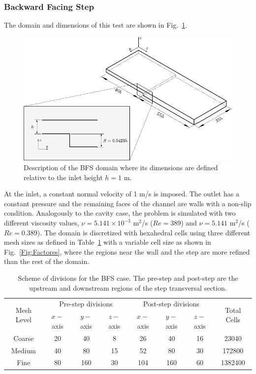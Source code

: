 \documentclass[final,3p,times,11pt,onecolumn]{myElsarticle}
\numberwithin{equation}{section}
\begin{document}
\subsubsection{Backward Facing Step}
The domain and dimensions of this test are shown in Fig.~\ref{Fig:Geometria3}.
\begin{figure}[t!!!]
\centering
\includegraphics[width=12cm]{fig/Cases/Geometria3.pdf}
\caption{Description of the BFS domain where its dimensions are defined relative to the inlet height $h = 1$ m.}
\label{Fig:Geometria3}
\end{figure}
At the inlet, a constant normal velocity of 1 m/s is imposed. The outlet has a constant pressure and the remaining faces of the channel are walls with a non-slip condition. Analogously to the cavity case, the problem is simulated with two different viscosity values, $\nu = 5.141 \times 10^{-3}$ m$^2$/s ($Re=389$) and $\nu = 5.141$ m$^2$/s ($Re=0.389$). The domain is discretized with hexahedral cells using three different mesh sizes as defined in Table~\ref{Table:BFSMeshes} with a variable cell size as shown in Fig.~\ref{Fig:Factores}, where the regions near the wall and the step are more refined than the rest of the domain.
\begin{table}[b!]
\centering
\begin{tabular}{cccccccc}
\hline 
\multirow{2}{1cm}{Mesh Level} & \multicolumn{3}{c}{Pre-step divisions} & \multicolumn{3}{c}{Post-step divisions} & \multirow{2}{1cm}{Total Cells} \\ 
\cline{2-7} 
&  $x-$axis &  $y-$axis &  $z-$axis &  $x-$axis &  $y-$axis &  $z-$axis \\ 
\hline 
Coarse & 20 & 40 & 8 & 26 & 40 & 16 & 23040 \\ 
Medium & 40 & 80 & 15 & 52 & 80 & 30 & 172800 \\ 
Fine & 80 & 160 & 30 & 104 & 160 & 60 & 1382400 \\ 
\hline 
\end{tabular}
\caption{Scheme of divisions for the BFS case. The pre-step and post-step are the upstream and downstream regions of the step transversal section.}
\label{Table:BFSMeshes}
\end{table}
\end{document}
